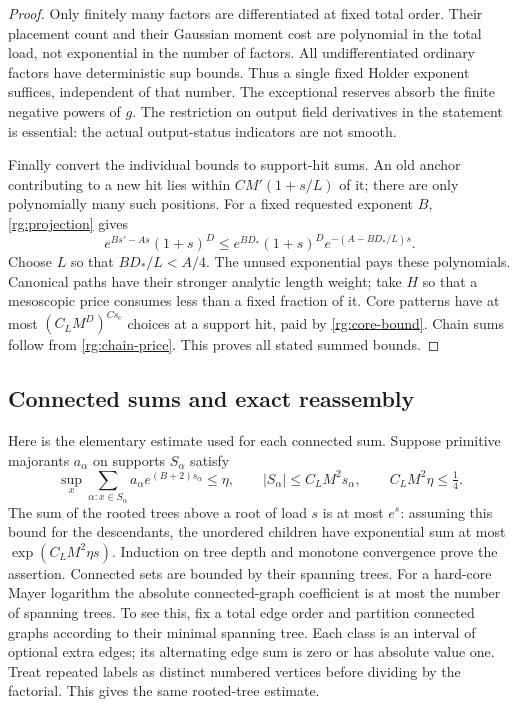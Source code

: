 \begin{proof}
Only finitely many factors are differentiated at fixed total order.
Their placement count and their Gaussian moment cost are polynomial
in the total load, not exponential in the number of factors.
All undifferentiated ordinary factors have deterministic sup bounds.
Thus a single fixed Holder exponent suffices, independent of that
number.  The exceptional reserves absorb the finite negative powers
of $g$.  The restriction on output field derivatives in the statement
is essential: the actual output-status indicators are not smooth.

Finally convert the individual bounds to support-hit sums.  An old
anchor contributing to a new hit lies within $CM'(1+s/L)$ of it;
there are only polynomially many such positions.  For a fixed
requested exponent $B$, \eqref{rg:projection} gives
\[
 e^{Bs'-As}(1+s)^D
 \le e^{BD_*}(1+s)^De^{-(A-BD_*/L)s}.
\]
Choose $L$ so that $BD_*/L<A/4$.  The unused exponential pays these
polynomials.  Canonical paths have their stronger analytic length
weight; take $H$ so that a mesoscopic price consumes less than a
fixed fraction of it.  Core patterns have at most
$(C_LM^D)^{Cs_c}$ choices at a support hit, paid by
\eqref{rg:core-bound}.  Chain sums follow from
\eqref{rg:chain-price}.  This proves all stated summed bounds.
\end{proof}

\subsection{Connected sums and exact reassembly}
\label{rg:connected}

Here is the elementary estimate used for each connected sum.  Suppose
primitive majorants $a_\alpha$ on supports $S_\alpha$ satisfy
\begin{equation}
 \sup_x\sum_{\alpha:x\in S_\alpha}
            a_\alpha e^{(B+2)s_\alpha}\le\eta,
 \qquad |S_\alpha|\le C_LM^2s_\alpha,
 \qquad C_LM^2\eta\le\tfrac14.
 \label{rg:tree-condition}
\end{equation}
The sum of the rooted trees above a root of load $s$ is at most
$e^s$: assuming this bound for the descendants, the unordered
children have exponential sum at most $\exp(C_LM^2\eta s)$.
Induction on tree depth and monotone convergence prove the assertion.
Connected sets are bounded by their spanning trees.  For a hard-core
Mayer logarithm the absolute connected-graph coefficient is at most
the number of spanning trees.  To see this, fix a total edge order
and partition connected graphs according to their minimal spanning
tree.  Each class is an interval of optional extra edges; its
alternating edge sum is zero or has absolute value one.  Treat
repeated labels as distinct numbered vertices before dividing by
the factorial.  This gives the same rooted-tree estimate.

